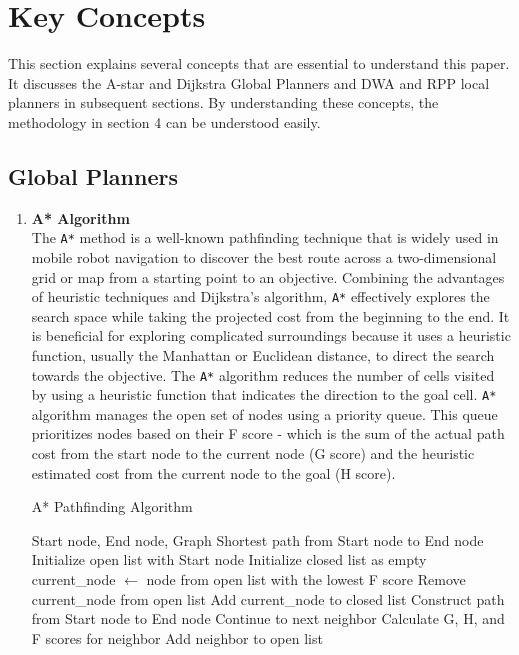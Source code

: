 \documentclass[sigconf]{acmart}
\begin{document}
\section{Key Concepts}

This section explains several concepts that are essential to understand this paper. It discusses the A-star and Dijkstra Global Planners and DWA and RPP local planners in subsequent sections. By understanding these concepts, the methodology in section 4 can be understood easily.

\subsection{Global Planners}

\begin{enumerate}
    \item \textbf{A* Algorithm}\\
The \texttt{A*} method is a well-known pathfinding technique that is widely used in mobile robot navigation to discover the best route across a two-dimensional grid or map from a starting point to an objective. Combining the advantages of heuristic techniques and Dijkstra's algorithm, \texttt{A*} effectively explores the search space while taking the projected cost from the beginning to the end. It is beneficial for exploring complicated surroundings because it uses a heuristic function, usually the Manhattan or Euclidean distance, to direct the search towards the objective. The \texttt{A*} algorithm reduces the number of cells visited by using a heuristic function that indicates the direction to the goal cell\cite{b2}. \texttt{A*} algorithm manages the open set of nodes using a priority queue. This queue prioritizes nodes based on their F score - which is the sum of the actual path cost from the start node to the current node (G score) and the heuristic estimated cost from the current node to the goal (H score).

\begin{algorithm}
\caption{A* Pathfinding Algorithm}
\begin{algorithmic}[1]
\REQUIRE Start node, End node, Graph
\ENSURE Shortest path from Start node to End node
\STATE Initialize open list with Start node
\STATE Initialize closed list as empty
    \STATE current\_node $\leftarrow$ node from open list with the lowest F score
    \STATE Remove current\_node from open list
    \STATE Add current\_node to closed list
        \RETURN Construct path from Start node to End node
    \ENDIF
            \STATE Continue to next neighbor
        \ENDIF
        \STATE Calculate G, H, and F scores for neighbor
            \STATE Add neighbor to open list
        \ENDIF
    \ENDFOR
\ENDWHILE
\end{algorithmic}
\end{algorithm}







\end{enumerate}
\end{document}
